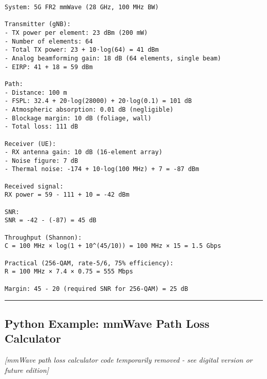 \begin{verbatim}
System: 5G FR2 mmWave (28 GHz, 100 MHz BW)

Transmitter (gNB):
- TX power per element: 23 dBm (200 mW)
- Number of elements: 64
- Total TX power: 23 + 10·log(64) = 41 dBm
- Analog beamforming gain: 18 dB (64 elements, single beam)
- EIRP: 41 + 18 = 59 dBm

Path:
- Distance: 100 m
- FSPL: 32.4 + 20·log(28000) + 20·log(0.1) = 101 dB
- Atmospheric absorption: 0.01 dB (negligible)
- Blockage margin: 10 dB (foliage, wall)
- Total loss: 111 dB

Receiver (UE):
- RX antenna gain: 10 dB (16-element array)
- Noise figure: 7 dB
- Thermal noise: -174 + 10·log(100 MHz) + 7 = -87 dBm

Received signal:
RX power = 59 - 111 + 10 = -42 dBm

SNR:
SNR = -42 - (-87) = 45 dB

Throughput (Shannon):
C = 100 MHz × log(1 + 10^(45/10)) = 100 MHz × 15 = 1.5 Gbps

Practical (256-QAM, rate-5/6, 75% efficiency):
R = 100 MHz × 7.4 × 0.75 = 555 Mbps

Margin: 45 - 20 (required SNR for 256-QAM) = 25 dB 
\end{verbatim}

\begin{center}\rule{0.5\linewidth}{0.5pt}\end{center}

\subsection{\texorpdfstring{ Python Example: mmWave Path Loss
Calculator}{ Python Example: mmWave Path Loss Calculator}}\label{python-example-mmwave-path-loss-calculator}


\begin{center}
\textit{[mmWave path loss calculator code temporarily removed - see digital version or future edition]}
\end{center}


